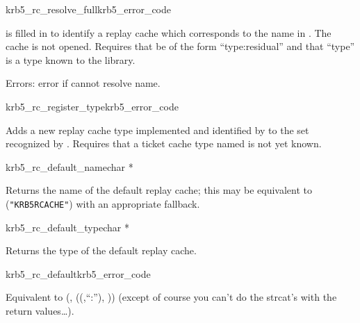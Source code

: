 \begin{funcdecl}{krb5_rc_resolve_full}{krb5_error_code}{\funcinout}
\funcin
{}
\end{funcdecl}

 is filled in to identify a replay cache which
corresponds to the name in .  The cache is not opened.
Requires that  be of the form ``type:residual''
and that ``type'' is a type known to the library.

Errors: error if cannot resolve name.

\begin{funcdecl}{krb5_rc_register_type}{krb5_error_code}{\funcin}
\end{funcdecl}
Adds a new replay cache type implemented and identified by
 to the set recognized by
.  Requires that a ticket cache type named
 is not yet known.


\begin{funcdecl}{krb5_rc_default_name}{char *}{\funcvoid}
\end{funcdecl}
Returns  the name of the default replay cache; this may be equivalent to
({\tt "KRB5RCACHE"}) with an appropriate fallback.

\begin{funcdecl}{krb5_rc_default_type}{char *}{\funcvoid}
\end{funcdecl}

Returns the type of the default replay cache.

\begin{funcdecl}{krb5_rc_default}{krb5_error_code}{\funcinout}
\end{funcdecl}
Equivalent to (,
((,``:''),
)) (except of course you can't do the
strcat's with the return values\ldots).
